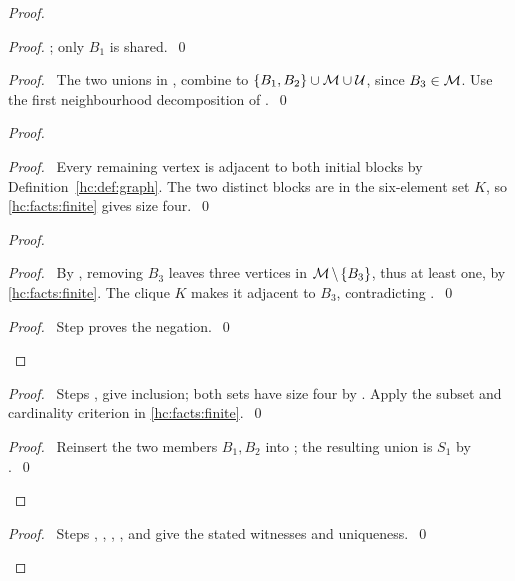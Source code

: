 \begin{mergedproofsection}
\begin{proof}
\begin{proof}
  ; only $B_1$ is shared.~\qed\end{proof}
 \begin{proof}\pf\ The two unions in ,
   combine to $\{B_1,B_2\}\cup{\mathcal M}\cup{\mathcal U}$,
  since $B_3\in{\mathcal M}$. Use the first neighbourhood decomposition
  of .~\qed\end{proof}
 \begin{proof}
  \begin{proof}\pf\ Every remaining vertex is adjacent to both
   initial blocks by Definition~\ref{hc:def:graph}. The two
   distinct blocks are in the six-element set $K$, so
   \ref{hc:facts:finite} gives size four.~\qed\end{proof}
  \begin{proof}
   \begin{proof}\pf\ By , removing $B_3$
    leaves three vertices in ${\mathcal M}\mathbin{\mkern-1.5mu\setminus\mkern-1.5mu}\{B_3\}$, thus at least
    one, by \ref{hc:facts:finite}. The clique $K$ makes it adjacent
    to $B_3$, contradicting .~\qed\end{proof}
   \qedstep
   \begin{proof}\pf\ Step  proves the negation.~\qed\end{proof}
  \end{proof}
  \begin{proof}\pf\ Steps , 
   give inclusion; both sets have size four by .
   Apply the subset and cardinality criterion in \ref{hc:facts:finite}.~\qed\end{proof}
  \qedstep
  \begin{proof}\pf\ Reinsert the two members $B_1,B_2$ into
   ; the resulting union is $S_1$ by
   .~\qed\end{proof}
 \end{proof}
 \qedstep
 \begin{proof}\pf\ Steps , ,
  , , and
   give the stated witnesses and uniqueness.~\qed\end{proof}
\end{proof}


\end{mergedproofsection}
